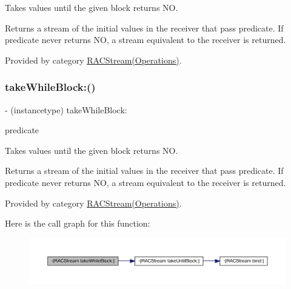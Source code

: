 Takes values until the given block returns {\ttfamily NO}.

Returns a stream of the initial values in the receiver that pass {\ttfamily predicate}. If {\ttfamily predicate} never returns {\ttfamily NO}, a stream equivalent to the receiver is returned. 

Provided by category \mbox{\hyperlink{category_r_a_c_stream_07_operations_08_ae3b27f126fffcf5dfb8eaa6bd71c5fc4}{R\+A\+C\+Stream(\+Operations)}}.

\mbox{\label{interface_r_a_c_stream_ae3b27f126fffcf5dfb8eaa6bd71c5fc4}} 
\subsubsection{\texorpdfstring{take\+While\+Block\+:()}{takeWhileBlock:()}\hspace{0.1cm}{\footnotesize\ttfamily [2/3]}}
{\footnotesize\ttfamily -\/ (instancetype) take\+While\+Block\+: \begin{DoxyParamCaption}\item[{(B\+O\+OL($^\wedge$)(id x))}]{predicate }\end{DoxyParamCaption}}

Takes values until the given block returns {\ttfamily NO}.

Returns a stream of the initial values in the receiver that pass {\ttfamily predicate}. If {\ttfamily predicate} never returns {\ttfamily NO}, a stream equivalent to the receiver is returned. 

Provided by category \mbox{\hyperlink{category_r_a_c_stream_07_operations_08_ae3b27f126fffcf5dfb8eaa6bd71c5fc4}{R\+A\+C\+Stream(\+Operations)}}.

Here is the call graph for this function\+:\nopagebreak
\begin{figure}[H]
\begin{center}
\leavevmode
\includegraphics[width=350pt]{interface_r_a_c_stream_ae3b27f126fffcf5dfb8eaa6bd71c5fc4_cgraph}
\end{center}
\end{figure}
\mbox{\label{interface_r_a_c_stream_ae3b27f126fffcf5dfb8eaa6bd71c5fc4}} 
